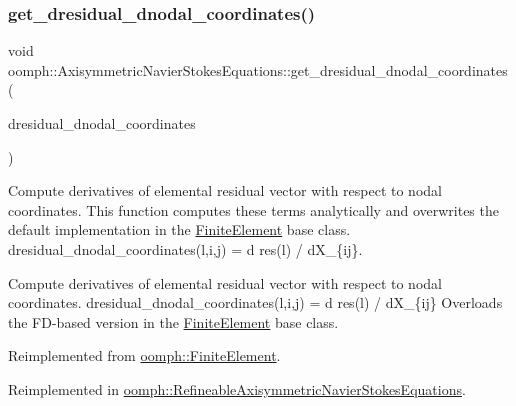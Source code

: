 \mbox{\label{classoomph_1_1AxisymmetricNavierStokesEquations_aea99b11bfac734a5c868aaafffadd820}} 
\subsubsection{\texorpdfstring{get\+\_\+dresidual\+\_\+dnodal\+\_\+coordinates()}{get\_dresidual\_dnodal\_coordinates()}}
{\footnotesize\ttfamily void oomph\+::\+Axisymmetric\+Navier\+Stokes\+Equations\+::get\+\_\+dresidual\+\_\+dnodal\+\_\+coordinates (\begin{DoxyParamCaption}\item[{\hyperlink{classoomph_1_1RankThreeTensor}{Rank\+Three\+Tensor}$<$ double $>$ \&}]{dresidual\+\_\+dnodal\+\_\+coordinates }\end{DoxyParamCaption})\hspace{0.3cm}{\ttfamily [virtual]}}



Compute derivatives of elemental residual vector with respect to nodal coordinates. This function computes these terms analytically and overwrites the default implementation in the \hyperlink{classoomph_1_1FiniteElement}{Finite\+Element} base class. dresidual\+\_\+dnodal\+\_\+coordinates(l,i,j) = d res(l) / d\+X\+\_\+\{ij\}. 

Compute derivatives of elemental residual vector with respect to nodal coordinates. dresidual\+\_\+dnodal\+\_\+coordinates(l,i,j) = d res(l) / d\+X\+\_\+\{ij\} Overloads the F\+D-\/based version in the \hyperlink{classoomph_1_1FiniteElement}{Finite\+Element} base class. 

Reimplemented from \hyperlink{classoomph_1_1FiniteElement_ae4b85a31a983a52d3010930f9e0851b8}{oomph\+::\+Finite\+Element}.



Reimplemented in \hyperlink{classoomph_1_1RefineableAxisymmetricNavierStokesEquations_ab790c42884b501ba2d6d58f92eb26a6a}{oomph\+::\+Refineable\+Axisymmetric\+Navier\+Stokes\+Equations}.



